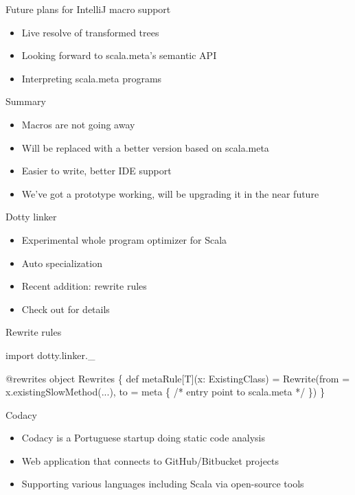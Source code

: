 \documentclass[svgnames,dvipsnames,hyperref={bookmarks=false},usepdftitle=false]{beamer}
\begin{document}
\begin{frame}{Future plans for IntelliJ macro support}
\begin{itemize}
\item Live resolve of transformed trees
\item Looking forward to scala.meta's semantic API
\item Interpreting scala.meta programs
\end{itemize}
\end{frame}

\begin{frame}{Summary}
\begin{itemize}
\item Macros are not going away
\item Will be replaced with a better version based on scala.meta
\item Easier to write, better IDE support
\item We've got a prototype working, will be upgrading it in the near future
\end{itemize}
\end{frame}


\begin{frame}{Dotty linker}
\begin{itemize}
\item Experimental whole program optimizer for Scala
\item Auto specialization
\item Recent addition: rewrite rules
\item Check out  for details
\end{itemize}
\end{frame}

\begin{frame}[fragile]{Rewrite rules}
\begin{semiverbatim}
import dotty.linker._

@rewrites
object Rewrites \{
  def metaRule[T](x: ExistingClass) =
    Rewrite(from = x.existingSlowMethod(...),
              to = meta \{ /* entry point to scala.meta */ \})
\}
\end{semiverbatim}
\end{frame}


\begin{frame}{Codacy}
\begin{itemize}
\item Codacy is a Portuguese startup doing static code analysis
\item Web application that connects to GitHub/Bitbucket projects
\item Supporting various languages including Scala via open-source tools
\end{itemize}
\end{frame}
\end{document}

